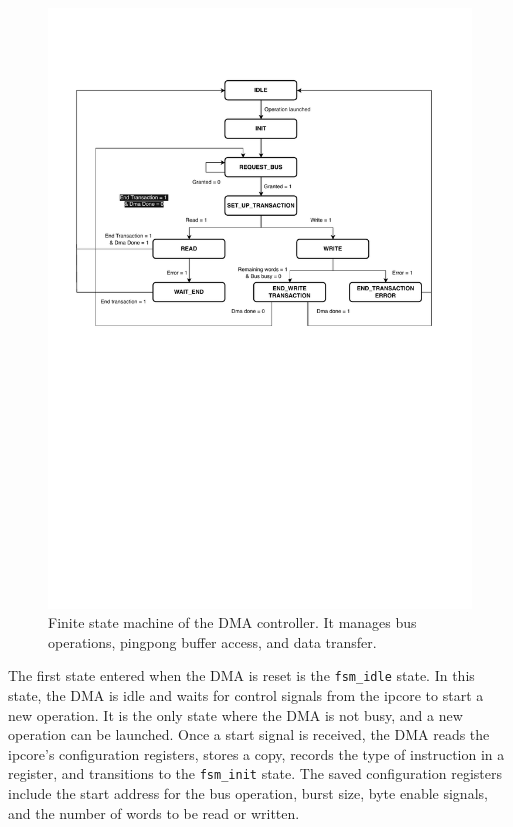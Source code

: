 \documentclass[a4paper,11pt,oneside]{report}
\begin{document}
\begin{figure}[H]
    \centering
    \includegraphics[width=0.9\linewidth]{figures/dma_fsm.pdf}
    \caption{Finite state machine of the DMA controller. It manages bus operations, pingpong buffer access, and data transfer.}
    \label{fig:state_diagram}
\end{figure}

The first state entered when the DMA is reset is the \texttt{fsm\_idle} state.  
In this state, the DMA is idle and waits for control signals from the ipcore to start a new operation.  
It is the only state where the DMA is not busy, and a new operation can be launched.  
Once a start signal is received, the DMA reads the ipcore's configuration registers, stores a copy,  
records the type of instruction in a register, and transitions to the \texttt{fsm\_init} state.  
The saved configuration registers include the start address for the bus operation, burst size, byte enable signals, and the number of words to be read or written.
\end{document}
